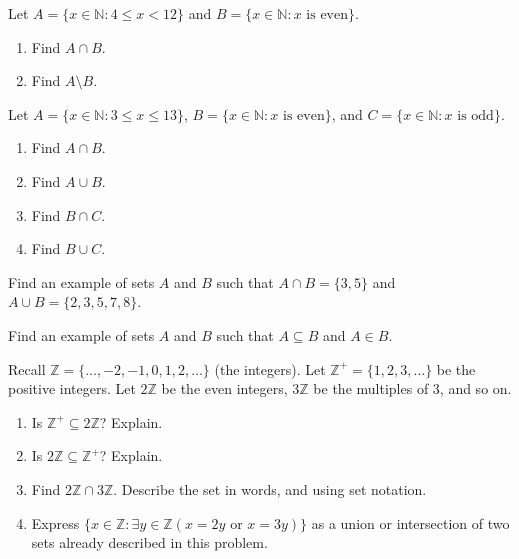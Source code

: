 \documentclass[11pt,]{book}
\theoremstyle{ptxplainnotitle}
\theoremstyle{ptxplaintitle}
\theoremstyle{ptxdefinitionnotitle}
\theoremstyle{ptxdefinitiontitle}
\theoremstyle{ptxdefinitionnotitle}
\theoremstyle{ptxdefinitiontitle}
\theoremstyle{ptxdefinitionnotitle}
\theoremstyle{ptxdefinitiontitle}
\theoremstyle{ptxdefinitiontitlenonumber}
\theoremstyle{ptxdefinitiontitlenonumber}
\numberwithin{equation}{chapter}
\newcommand{\N}{\mathbb N}
\newcommand{\Z}{\mathbb Z}
\newcommand{\st}{:}
\newcommand{\lt}{<}
\begin{document}
\begin{divisionexercise}{9}\hypertarget{exercise-86}{}
\hypertarget{p-924}{}%
Let \(A = \{x \in \N \st 4 \le x \lt 12\}\) and \(B = \{x \in \N \st x \text{ is even}\}\text{.}\) \leavevmode%
\begin{enumerate}[label=\alph*.]
\item\hypertarget{li-401}{}\hypertarget{p-925}{}%
Find \(A \cap B\text{.}\)%
\item\hypertarget{li-402}{}\hypertarget{p-927}{}%
Find \(A \setminus B\text{.}\)%
\end{enumerate}
%
\end{divisionexercise}%
\begin{divisionexercise}{10}\hypertarget{exercise-87}{}
\hypertarget{p-933}{}%
Let \(A = \{x \in \N \st 3 \le x \le 13\}\), \(B = \{x \in \N \st x \mbox{ is even} \}\), and \(C = \{x \in \N \st x \mbox{ is odd} \}\). \leavevmode%
\begin{enumerate}[label=(\alph*)]
\item\hypertarget{li-405}{}\hypertarget{p-934}{}%
Find \(A \cap B\).%
\item\hypertarget{li-406}{}\hypertarget{p-935}{}%
Find \(A \cup B\).%
\item\hypertarget{li-407}{}\hypertarget{p-936}{}%
Find \(B \cap C\).%
\item\hypertarget{li-408}{}\hypertarget{p-937}{}%
Find \(B \cup C\).%
\end{enumerate}
%
\end{divisionexercise}%
\begin{divisionexercise}{11}\hypertarget{exercise-88}{}
\hypertarget{p-939}{}%
Find an example of sets \(A\) and \(B\) such that \(A\cap B = \{3, 5\}\) and \(A \cup B = \{2, 3, 5, 7, 8\}\).%
\end{divisionexercise}%
\begin{divisionexercise}{12}\hypertarget{exercise-89}{}
\hypertarget{p-940}{}%
Find an example of sets \(A\) and \(B\) such that \(A \subseteq B\) and \(A \in B\).%
\end{divisionexercise}%
\begin{divisionexercise}{13}\hypertarget{exercise-90}{}
\hypertarget{p-942}{}%
Recall \(\Z = \{\ldots,-2,-1,0, 1,2,\ldots\}\) (the integers). Let \(\Z^+ = \{1, 2, 3, \ldots\}\) be the positive integers. Let \(2\Z\) be the even integers, \(3\Z\) be the multiples of 3, and so on. \leavevmode%
\begin{enumerate}[label=(\alph*)]
\item\hypertarget{li-413}{}\hypertarget{p-943}{}%
Is \(\Z^+ \subseteq 2\Z\)? Explain.%
\item\hypertarget{li-414}{}\hypertarget{p-944}{}%
Is \(2\Z \subseteq \Z^+\)? Explain.%
\item\hypertarget{li-415}{}\hypertarget{p-945}{}%
Find \(2\Z \cap 3\Z\). Describe the set in words, and using set notation.%
\item\hypertarget{li-416}{}\hypertarget{p-946}{}%
Express \(\{x \in \Z \st \exists y\in \Z (x = 2y \text{ or } x = 3y)\}\) as a union or intersection of two sets already described in this problem.%
\end{enumerate}
%
\end{divisionexercise}%
\end{document}
